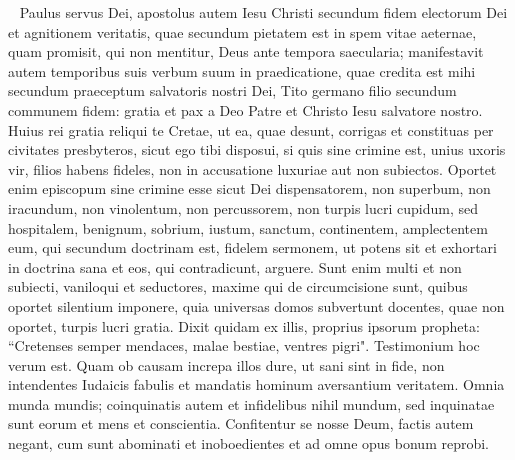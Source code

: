 
\begin{biblechapter}   
\verse Paulus servus Dei, apostolus autem Iesu Christi secundum fidem electorum Dei et agnitionem veritatis, quae secundum pietatem est 
\verse in spem vitae aeternae, quam promisit, qui non mentitur, Deus ante tempora saecularia; 
\verse manifestavit autem temporibus suis verbum suum in praedicatione, quae credita est mihi secundum praeceptum salvatoris nostri Dei,  
\verse Tito germano filio secundum communem fidem: gratia et pax a Deo Patre et Christo Iesu salvatore nostro. 
\verse Huius rei gratia reliqui te Cretae, ut ea, quae desunt, corrigas et constituas per civitates presbyteros, sicut ego tibi disposui, 
\verse si quis sine crimine est, unius uxoris vir, filios habens fideles, non in accusatione luxuriae aut non subiectos. 
\verse Oportet enim episcopum sine crimine esse sicut Dei dispensatorem, non superbum, non iracundum, non vinolentum, non percussorem, non turpis lucri cupidum, 
\verse sed hospitalem, benignum, sobrium, iustum, sanctum, continentem, 
\verse amplectentem eum, qui secundum doctrinam est, fidelem sermonem, ut potens sit et exhortari in doctrina sana et eos, qui contradicunt, arguere. 
\verse Sunt enim multi et non subiecti, vaniloqui et seductores, maxime qui de circumcisione sunt, 
\verse quibus oportet silentium imponere, quia universas domos subvertunt docentes, quae non oportet, turpis lucri gratia. 
\verse Dixit quidam ex illis, proprius ipsorum propheta: “Cretenses semper mendaces, malae bestiae, ventres pigri". 
\verse Testimonium hoc verum est. Quam ob causam increpa illos dure, ut sani sint in fide, 
\verse non intendentes Iudaicis fabulis et mandatis hominum aversantium veritatem. 
\verse Omnia munda mundis; coinquinatis autem et infidelibus nihil mundum, sed inquinatae sunt eorum et mens et conscientia. 
\verse Confitentur se nosse Deum, factis autem negant, cum sunt abominati et inoboedientes et ad omne opus bonum reprobi.  
\end{biblechapter}

